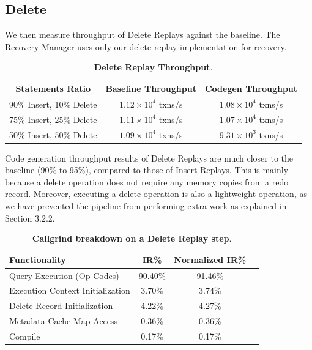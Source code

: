 \documentclass[12pt]{cmuthesis}
\begin{document}
\subsection{Delete}
We then measure throughput of Delete Replays against the baseline. The Recovery Manager uses only our delete replay implementation for recovery.
\begin{table}[H]
\begin{center}
\begin{tabular}{ c c c } 
 \toprule
\textbf{Statements Ratio} & \textbf{Baseline Throughput} & \textbf{Codegen Throughput}\\
 \toprule
 90\% Insert, 10\% Delete & $1.12 \times 10^4$ txns/s & $1.08\times 10^4$ txns/s \\ 
 \midrule
 75\% Insert, 25\% Delete & $1.11 \times 10^4$ txns/s & $1.07 \times 10^4$ txns/s\\
 \midrule
 50\% Insert, 50\% Delete & $1.09 \times 10^4$ txns/s & $9.31 \times 10^3$ txns/s\\
 \bottomrule
\end{tabular}
\caption{\textbf{Delete Replay Throughput}.}
\label{tab:throughput_exp_delete}
\end{center}
\end{table}

Code generation throughput results of Delete Replays are much closer to the baseline (90\% to 95\%), compared to those of Insert Replays. This is mainly because a delete operation does not require any memory copies from a redo record. Moreover, executing a delete operation is also a lightweight operation, as we have prevented the pipeline from performing extra work as explained in Section 3.2.2.

\begin{table}[H]
\begin{center}
\begin{tabular}{ l c c l } 
 \toprule
\textbf{Functionality} & \textbf{IR\%} & \textbf{Normalized IR\%}\\ 
 \toprule
Query Execution (Op Codes) & 90.40\% & 91.46\%\\
 \midrule
 Execution Context Initialization & 3.70\% & 3.74\% \\ 
 \midrule
 Delete Record Initialization &4.22\% & 4.27\% \\
 \midrule
 Metadata Cache Map Access & 0.36\% & 0.36\% \\
 \midrule
 Compile & 0.17\% & 0.17\% \\
 \bottomrule
\end{tabular}

\caption{\textbf{Callgrind breakdown on a Delete Replay step}.}
\label{tab:throughput_exp_delete_overhead_all}
\end{center}
\end{table}
\end{document}
